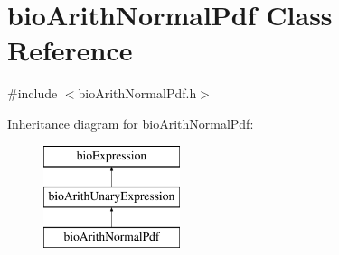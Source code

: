\hypertarget{classbio_arith_normal_pdf}{}\section{bio\+Arith\+Normal\+Pdf Class Reference}
\label{classbio_arith_normal_pdf}


{\ttfamily \#include $<$bio\+Arith\+Normal\+Pdf.\+h$>$}

Inheritance diagram for bio\+Arith\+Normal\+Pdf\+:\begin{figure}[H]
\begin{center}
\leavevmode
\includegraphics[height=3.000000cm]{classbio_arith_normal_pdf}
\end{center}
\end{figure}

